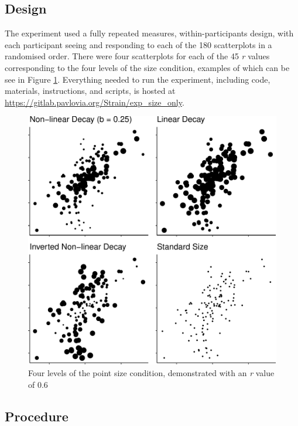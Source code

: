 \documentclass{vgtc}                          %
\begin{document}
\hypertarget{design}{%
\subsection{Design}\label{design}}

The experiment used a fully repeated measures, within-participants design, with each
participant seeing and responding to each of the 180 scatterplots in a randomised order.
There were four scatterplots for each of the 45 \emph{r} values corresponding to the
four levels of the size condition, examples of which can be see in Figure \ref{fig:examples}.
Everything needed to run the experiment, including code, materials, instructions, and scripts, is
hosted at \url{https://gitlab.pavlovia.org/Strain/exp_size_only}.

\begin{figure}
\includegraphics[width=1\linewidth]{size_and_scatterplots_files/figure-latex/examples-1} \caption{Four levels of the point size condition, demonstrated with an \textit{r} value of 0.6}\label{fig:examples}
\end{figure}

\hypertarget{procedure}{%
\subsection{Procedure}\label{procedure}}
\end{document}
